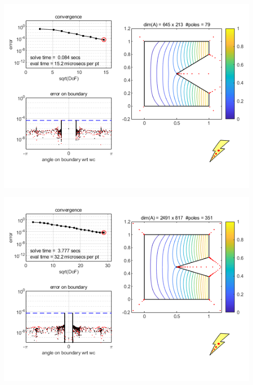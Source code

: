 \documentclass{seminar}
\begin{document}
\begin{slide} %
\begin{center}
\includegraphics[scale=0.7]{./PNG/squarePacMan1}
\end{center}
\end{slide}
\begin{slide}
\begin{center}
\includegraphics[scale=0.7]{./PNG/squarePacMan2}
\end{center}
\end{slide}
\end{document}
